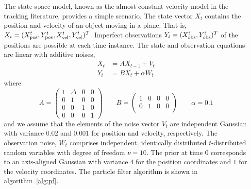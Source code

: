 The state space model, known as the almost constant velocity model in the
tracking literature, provides a simple scenario. The state vector $X_t$
contains the position and velocity of an object moving in a plane. That is,
$X_t = (X_{\mathrm{pos}}^t, Y_{\mathrm{pos}}^t, X_{\mathrm{vel}}^t, Y_{\mathrm{vel}}^t)^T$. Imperfect observations $Y_t =
(X_{\mathrm{obs}}^t, Y_{\mathrm{obs}}^t)^T$ of the positions are possible at each time instance. The
state and observation equations are linear with additive noises,
\begin{align*}
  X_t &= AX_{t-1} + V_t \\
  Y_t &= BX_t + \alpha W_t
\end{align*}
where
\begin{equation*}
  A = \begin{pmatrix}
    1 & \Delta & 0 & 0 \\
    0 & 1 & 0 & 0 \\
    0 & 0 & 1 & 0 \\
    0 & 0 & 0 & 1
  \end{pmatrix} \qquad
  B = \begin{pmatrix}
    1 & 0 & 0 & 0 \\
    0 & 1 & 0 & 0 \\
  \end{pmatrix} \qquad
  \alpha = 0.1
\end{equation*}
and we assume that the elements of the noise vector $V_t$ are independent
Gaussian with variance $0.02$ and $0.001$ for position and velocity,
respectively. The observation noise, $W_t$ comprises independent, identically
distributed $t$-distributed random variables with degree of freedom $\nu = 10$.
The prior at time $0$ corresponds to an axis-aligned Gaussian with variance $4$
for the position coordinates and $1$ for the velocity coordinates. The particle
filter algorithm is shown in algorithm~\ref{alg:pf}.

